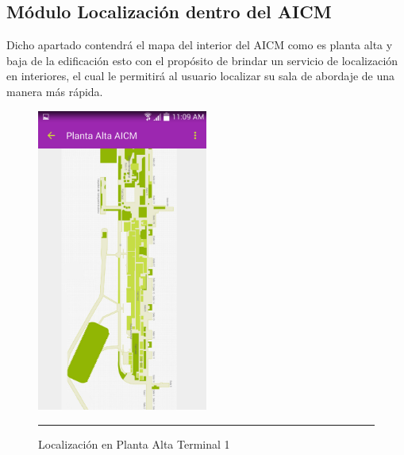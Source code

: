 \subsection{Módulo Localización dentro del AICM}
Dicho apartado contendrá el mapa del interior del AICM como es planta alta y baja de la edificación esto con el propósito de brindar un servicio de localización en interiores, 
el cual le permitirá al usuario localizar su sala de abordaje de una manera más rápida.

\begin{figure}[h]
	\centering
		\includegraphics[width=0.5\textwidth]{Figuras/ubikpa.png}
		\rule{30em}{0.5pt}
	\caption[Localización en Planta Alta Terminal 1]{Localización en Planta Alta Terminal 1}
	\label{fig:indoorPA}
\end{figure}

